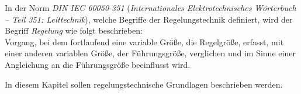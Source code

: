 
In der Norm \textit{DIN IEC 60050-351} (\textit{Internationales Elektrotechnisches Wörterbuch – Teil 351: Leittechnik}), welche Begriffe der Regelungstechnik definiert, wird der Begriff \textit{Regelung} wie folgt beschrieben: \cite{IEC60050-351}\\
\glqq Vorgang, bei dem fortlaufend eine variable Größe, die Regelgröße, erfasst, mit einer anderen variablen Größe, der Führungsgröße, verglichen und im Sinne einer Angleichung an die Führungsgröße beeinflusst wird.\\\grqq 


In diesem Kapitel sollen regelungstechnische Grundlagen beschrieben werden.


